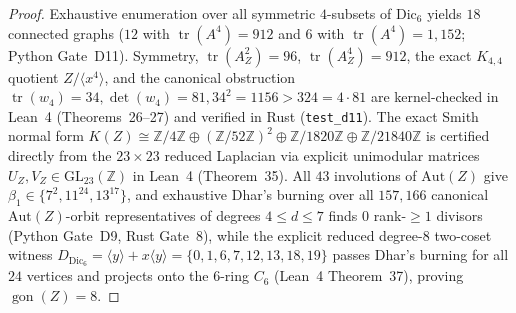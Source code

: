 \documentclass[11pt]{amsart}
\numberwithin{equation}{section}
\theoremstyle{plain}
\theoremstyle{definition}\newtheorem{definition}[theorem]{Definition}
\theoremstyle{remark}\newtheorem{remark}[theorem]{Remark}
\newcommand{\Z}{\mathbb{Z}}
\newcommand{\GL}{\mathrm{GL}}
\newcommand{\Aut}{\mathrm{Aut}}
\begin{document}
\begin{proof}
Exhaustive enumeration over all symmetric $4$-subsets of $\mathrm{Dic}_6$ yields $18$ connected graphs ($12$ with $\operatorname{tr}(A^4)=912$ and $6$ with $\operatorname{tr}(A^4)=1{,}152$; Python Gate~D11). Symmetry, $\operatorname{tr}(A_Z^2)=96$, $\operatorname{tr}(A_Z^4)=912$, the exact $K_{4,4}$ quotient $Z/\langle x^4\rangle$, and the canonical obstruction $\operatorname{tr}(w_4)=34, \det(w_4)=81, 34^2=1156>324=4\cdot 81$ are kernel-checked in Lean~4 (Theorems~26--27) and verified in Rust (\texttt{test\_d11}). The exact Smith normal form $K(Z)\cong\Z/4\Z\oplus(\Z/52\Z)^2\oplus\Z/1820\Z\oplus\Z/21840\Z$ is certified directly from the $23\times 23$ reduced Laplacian via explicit unimodular matrices $U_Z,V_Z\in\GL_{23}(\Z)$ in Lean~4 (Theorem~35). All $43$ involutions of $\Aut(Z)$ give $\beta_1\in\{7^2,11^{24},13^{17}\}$, and exhaustive Dhar's burning over all $157{,}166$ canonical $\Aut(Z)$-orbit representatives of degrees $4\le d\le 7$ finds $0$ rank-$\ge 1$ divisors (Python Gate~D9, Rust Gate~8), while the explicit reduced degree-$8$ two-coset witness $D_{\mathrm{Dic}_6}=\langle y\rangle+x\langle y\rangle=\{0,1,6,7,12,13,18,19\}$ passes Dhar's burning for all $24$ vertices and projects onto the $6$-ring $C_6$ (Lean~4 Theorem~37), proving $\operatorname{gon}(Z)=8$.
\end{proof}
\end{document}
